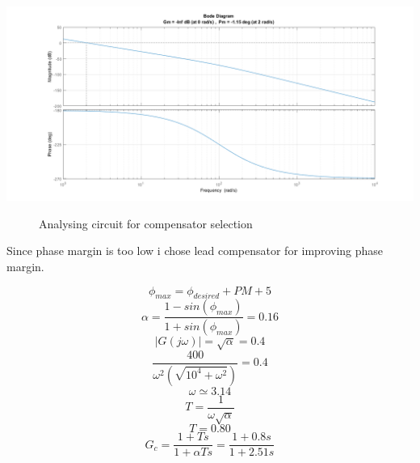 \documentclass[11pt]{report}
\begin{document}
\includegraphics[scale=0.55, center]{son}
\begin{figure}[H]
\caption{Analysing circuit for compensator selection}
\label{fig:zero}
\end{figure}
Since phase margin is too low i chose lead compensator for improving phase margin. 

\[\phi_{max} = \phi_{desired} + PM + 5 \]
\[\alpha = \frac{1-sin(\phi_{max})}{1+sin(\phi_{max})} = 0.16\]
\[|G(j\omega)|=\sqrt{\alpha}=0.4\]
\[\frac{400}{\omega^2(\sqrt{10^4+\omega^2})} =0.4\]
\[\omega \simeq 3.14\]
\[T = \frac{1}{\omega \sqrt{\alpha}}\]
\[T= 0.80\]
\[G_c = \frac{1+Ts}{1+\alpha T s} = \frac{1+0.8s}{1+2.51s}\]
\end{document}
